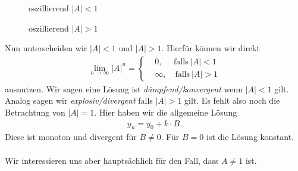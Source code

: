 \begin{figure}[H]
\centering
{}
\caption*{oszillierend $|A| < 1$}
\endminipage\hfill
{}
\centering
{}
\caption*{oszillierend $|A| > 1$}
\endminipage
\end{figure}
Nun unterscheiden wir $|A| < 1$ und $|A| > 1$.
Hierfür können wir direkt
\begin{align*}
\lim \limits_{n\to \infty} |A|^n
= 
\begin{cases}
&0 , \quad \text{ falls} \ |A|< 1\\
&\infty, \quad \text{falls} \ | A | > 1
\end{cases}
\end{align*}
ausnutzen.
Wir sagen eine Lösung ist \textit{dämpfend/konvergent} wenn $|A|<1 $ gilt.  Analog sagen wir \textit{explosiv/divergent} falls $|A| > 1$ gilt.
Es fehlt also noch die Betrachtung von $|A| = 1$.
Hier haben wir die allgemeine Lösung
\begin{align*}
y_n = y_0 + k \cdot B.
\end{align*}
Diese ist monoton und divergent für $B \neq 0$.
Für $B= 0$ ist die Lösung konstant.
\\
\\
Wir interessieren uns aber hauptsächlich für den Fall, dass $A \neq 1$ ist.



\newpage
